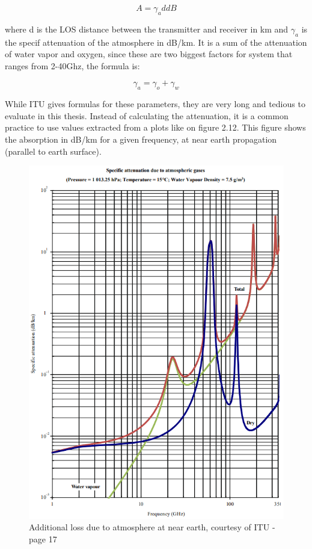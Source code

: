\begin{equation}
    A = \gamma_ad dB
\end{equation}

where d is the LOS distance between the transmitter and receiver in km and $\gamma_a$ is the specif attenuation of the atmosphere in dB/km. It is a sum of the attenuation of water vapor and oxygen, since these are two biggest factors for system that ranges from 2-40Ghz, the formula is:

\begin{equation}
    \gamma_a = \gamma_o + \gamma_w
\end{equation}

While ITU gives formulas for these parameters, they are very long and tedious to evaluate in this thesis. Instead of calculating the attenuation, it is a common practice to use values extracted from a plots like on figure 2.12. This figure shows the absorption in dB/km for a given frequency, at near earth propagation (parallel to earth surface). 

\begin{figure}[h]
\centering
\includegraphics[scale=0.8]{figures/AbsorbsAtmosphere.PNG}
\caption{Additional loss due to atmosphere at near earth, courtesy of ITU\cite{ITUAtmosphere} - page 17}
\end{figure}

